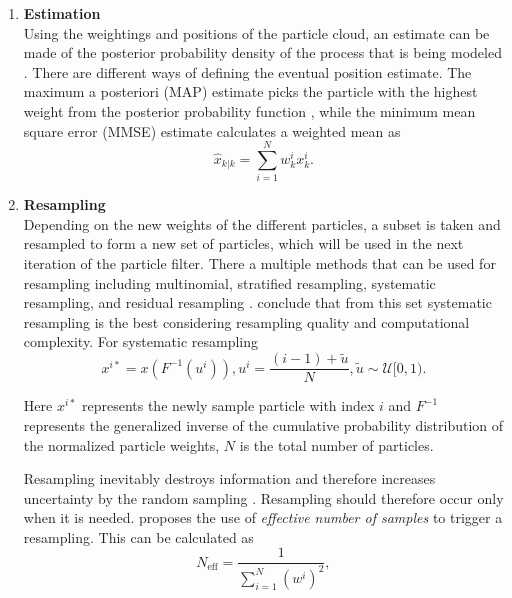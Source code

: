 \begin{enumerate}
	\item  \textbf{Estimation} \\
	Using the weightings and positions of the particle cloud, an estimate can be made of the posterior probability density of the process that is being modeled  \cite{gustafsson2010particle}. There are different ways of defining the eventual position estimate. The maximum a posteriori (MAP) estimate picks the particle with the highest weight from the posterior probability function \cite{Saha2009}, while the  minimum mean square error (MMSE) estimate calculates a weighted mean \cite{gustafsson2010particle,Saha2009} as
	\begin{equation}
	\hat{x}_{k | k} =\sum_{i=1}^{N} w_{k}^{i} x_{k}^{i}.
	\end{equation}
	
	\item \textbf{Resampling}\\
	Depending on the new weights of the different particles, a subset is taken and resampled to form a new set of particles, which will be used in the next iteration of the particle filter. There a multiple methods that can be used for resampling including multinomial, stratified resampling, systematic resampling, and	residual resampling \cite{hol2006resampling}. \citet{hol2006resampling} conclude that from this set systematic resampling is the best considering resampling quality and computational complexity. For systematic resampling
	\begin{subequations}
		\begin{equation}
		x^{i*} = x(F^{-1}(u^i)),
		\end{equation}
		\begin{equation}
		u^i = \frac{(i-1) + \tilde{u}}{N}, \tilde{u} \sim \mathcal{U}[0,1).
		\end{equation}
	\end{subequations}
	
	Here $x^{i*}$ represents the newly sample particle with index $i$ and $F^{-1}$ represents the generalized inverse of the cumulative probability distribution of the normalized particle weights, $N$ is the total number of particles. \par
	Resampling inevitably destroys information and therefore increases uncertainty by the random sampling \cite{gustafsson2010particle}. Resampling should therefore occur only when it is needed. \citet{gustafsson2010statistical} proposes the use of  \textit{effective number of samples} to trigger a  resampling. This can be calculated as 
	\begin{subequations}
		\begin{equation}
		N_{\mathrm{eff}}=\frac{1}{\sum_{i=1}^{N}\left(w^{i}\right)^{2}},
		\end{equation}
		

\end{subequations}
\end{enumerate}
